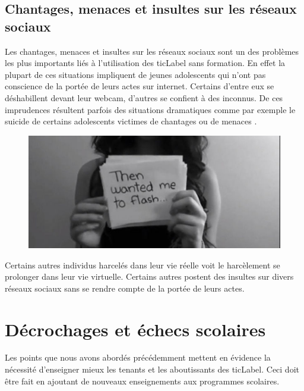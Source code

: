 
\section{Chantages, menaces et insultes sur les réseaux sociaux}
Les chantages, menaces et insultes sur les réseaux sociaux sont un des problèmes les plus importants liés à l'utilisation des \gls{ticLabel} sans formation. En effet la plupart de ces situations impliquent de jeunes adolescents qui n'ont pas conscience de la portée de leurs actes sur internet. Certains d'entre eux se déshabillent devant leur webcam, d'autres se confient à des inconnus. De ces imprudences résultent parfois des situations dramatiques comme par exemple le suicide de certains adolescents victimes de chantages ou de menaces \cite{chantage_facebook, harcel_facebook}.

\begin{figure}[h]
\centering
\includegraphics[scale=1]{../resources/illustrations/Amanda_Todd}
\end{figure}

Certains autres individus harcelés dans leur vie réelle voit le harcèlement se prolonger dans leur vie virtuelle. Certains autres postent des insultes sur divers réseaux sociaux sans se rendre compte de la portée de leurs actes.




\chapter{Décrochages et échecs scolaires}
Les points que nous avons abordés précédemment mettent en évidence la nécessité d'enseigner mieux les tenants et les aboutissants des \gls{ticLabel}. Ceci doit être fait en ajoutant de nouveaux enseignements aux programmes scolaires.

